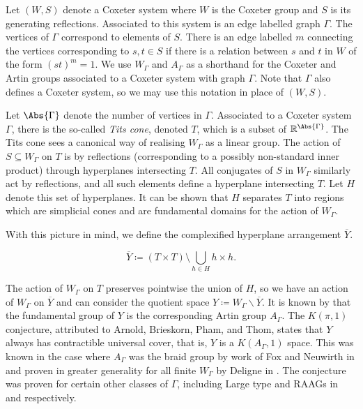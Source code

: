 Let $(W,S)$ denote a Coxeter system where $W$ is the Coxeter group and $S$ is its generating reflections.
Associated to this system is an edge labelled graph $\Gamma$.
The vertices of  $\Gamma$ correspond to elements of  $S$.
There is an edge labelled $m$ connecting the vertices corresponding to $s,t\in S$ if there is a relation between $s$ and  $t$ in  $W$ of the form  $(st)^m=1$.
We use $W_\Gamma$ and  $A_\Gamma$  as a shorthand for the Coxeter and Artin groups associated to a Coxeter system with graph $\Gamma$.
Note that $\Gamma$ also defines a Coxeter system, so we may use this notation in place of $(W,S)$.

Let $\Abs{\Gamma}$ denote the number of vertices in $\Gamma$.
Associated to a Coxeter system $\Gamma$, there is the so-called \emph{Tits cone}, denoted $T$, which is a subset of $\R^{\Abs{\Gamma}}$.
The Tits cone sees a canonical way of realising $W_\Gamma$ as a linear group.
The action of $S \subseteq W_\Gamma$ on  $T$ is by reflections (corresponding to a possibly non-standard inner product) through hyperplanes intersecting $T$.
All conjugates of $S$ in $W_\Gamma$ similarly act by reflections, and all such elements define a hyperplane intersecting $T$.
Let $H$ denote this set of hyperplanes.
It can be shown that $H$ separates  $T$ into regions which are simplicial cones and are fundamental domains for the action of  $W_\Gamma$.

With this picture in mind, we define the complexified hyperplane arrangement $\overline{Y}$.

\[
	\overline{Y} \coloneq \left(T \times T\right) \setminus \bigcup_{h \in H} h \times h
	.\]

The action of $W_\Gamma$ on $T$ preserves pointwise the union of $H$, so we have an action of $W_\Gamma$ on $\overline{Y}$ and can consider the quotient space  $Y \coloneq W_\Gamma \backslash \overline{Y}$.
It is known by \cite{lek_homotopy_1983} that the fundamental group of $Y$ is the corresponding Artin group  $A_\Gamma$.
The $K(\pi,1)$ conjecture, attributed to Arnold, Brieskorn, Pham, and Thom, states that $Y$ always has contractible universal cover, that is, $Y$ is a $K(A_\Gamma,1)$ space.
This was known in the case where $A_\Gamma$ was the braid group by work of Fox and Neuwirth in \cite{fox_neuwirth_braid_1962} and proven in greater generality for all finite $W_\Gamma$ by Deligne in \cite{deligne_immeubles_1972}.
The conjecture was proven for certain other classes of $\Gamma$, including Large type and RAAGs in \cite{hendriks_hyperplane_1985} and \cite{charney_davis_finite_2016} respectively.


